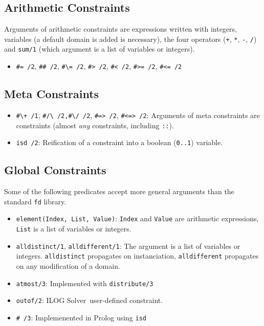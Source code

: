 \documentclass{article}
\newcommand{\solver}{ILOG Solver}
\begin{document}
\subsection{Arithmetic Constraints}

 Arguments of arithmetic constraints are expressions written with integers,
variables (a default domain is added is necessary), the four operators
(\verb"+", \verb"*", \verb"-", \verb"/") and \verb"sum/1" (which argument is
 a list of variables or integers).

 \begin{itemize}
 \item \verb"#= /2", \verb"## /2", \verb"#\= /2", \verb"#> /2", \verb"#< /2", \verb"#>= /2", \verb"#<= /2"
\end{itemize}

\subsection{Meta Constraints}

\begin{itemize}
 \item \verb"#\+ /1", \verb"#/\ /2,#\/ /2", \verb"#=> /2", \verb"#<=> /2":
 Arguments of meta constraints are constraints (almost {\em any} constraints,
 including \verb"::").

 \item \verb"isd /2": Reification of a constraint into a boolean (\verb"0..1") variable.
\end{itemize}

\subsection{Global Constraints}
Some of the following predicates accept more general arguments than the
standard \verb"fd" library.

\begin{itemize}
 \item \verb"element(Index, List, Value)": \verb"Index" and \verb"Value" are
 arithmetic expressions, \verb"List" is a list of variables or integers.

 \item \verb"alldistinct/1", \verb"alldifferent/1": The argument is a list of
 variables or integers. \verb"alldistinct" propagates on instanciation,
 \verb"alldifferent" propagates on any modification of a domain.

 \item \verb"atmost/3": Implemented with \verb"distribute/3"

 \item \verb"outof/2": \solver\ user-defined constraint.
 \item \verb"# /3": Implemenented in Prolog using \verb"isd"
\end{itemize}
\end{document}
